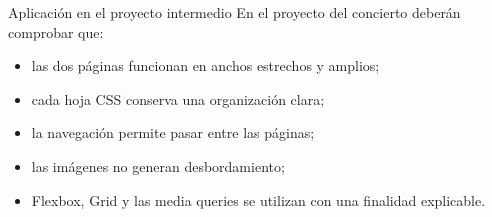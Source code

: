 \documentclass[aspectratio=169,11pt]{beamer}
\begin{document}
    \begin{frame}{Aplicación en el proyecto intermedio}
        En el proyecto del concierto deberán comprobar que:

        \begin{itemize}
            \item las dos páginas funcionan en anchos estrechos y amplios;
            \item cada hoja CSS conserva una organización clara;
            \item la navegación permite pasar entre las páginas;
            \item las imágenes no generan desbordamiento;
            \item Flexbox, Grid y las media queries se utilizan con una finalidad explicable.
        \end{itemize}

    \end{frame}
\end{document}
